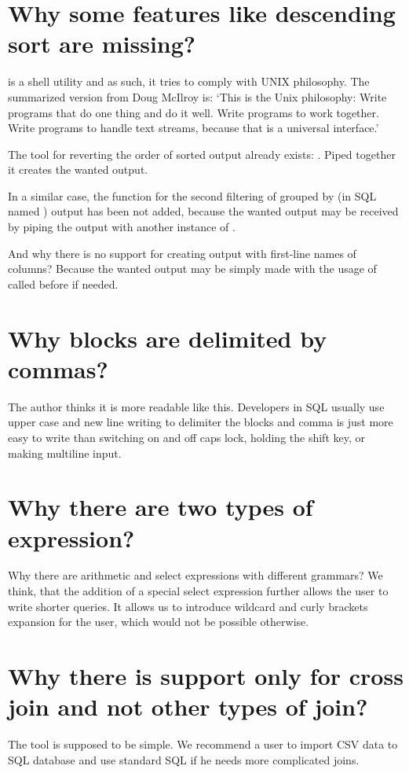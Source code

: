 \section{Why some features like descending sort are missing?}
 is a shell utility and as such, it tries to comply with UNIX philosophy. 
The summarized version from Doug McIlroy is: `This is the Unix philosophy: Write programs that do one thing and do it well. Write programs to work together. Write programs to handle text streams, because that is a universal interface.' \cite{unix-philosophy}

The tool for reverting the order of sorted output already exists: . Piped together it creates the wanted output.

In a similar case, the function for the second filtering of grouped by (in SQL named ) 
output has been not added, because the wanted output
may be received by piping the output with another instance of .

And why there is no support for creating output with first-line names of columns? Because the wanted output
may be simply made with the usage of  called before  if needed.

\section{Why blocks are delimited by commas?}
The author thinks it is more readable like this. Developers in SQL usually use upper case and new line writing to delimiter the blocks and comma is just more easy to write than switching on and off caps lock, 
holding the shift key, or making multiline input.

\section{Why there are two types of expression?}
Why there are arithmetic and select expressions with different grammars?
We think, that the addition of a special select expression further allows the user to write shorter queries.
It allows us to introduce wildcard and curly brackets expansion for the user, which would not be possible otherwise.

\section{Why there is support only for cross join and not other types of join?}
The tool is supposed to be simple. We recommend a user to import CSV data to SQL database and use standard SQL if he needs more complicated joins.

